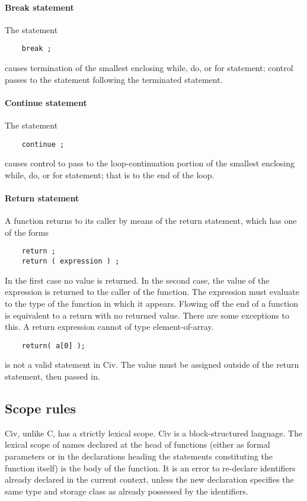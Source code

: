 \documentclass[a4paper]{article}
\begin{document}
\paragraph{Break statement}
The statement
\begin{verbatim}
    break ;
\end{verbatim}
causes termination of the smallest enclosing while, do, or for statement; control passes to the statement
following the terminated statement.

\paragraph{Continue statement}
The statement
\begin{verbatim}
    continue ;
\end{verbatim}
causes control to pass to the loop-continuation portion of the smallest enclosing while, do, or for statement; that is to the end of the loop.

\paragraph{Return statement}
A function returns to its caller by means of the return statement, which has one of the forms
\begin{verbatim}
    return ;
    return ( expression ) ;
\end{verbatim}
In the first case no value is returned. In the second case, the value of the expression is returned to the caller of the function. The expression must evaluate to the type of the function in which it appears.
Flowing off the end of a function is equivalent to a return with no returned value. There are some exceptions to this. A return expression cannot of type element-of-array. 
\begin{verbatim}
    return( a[0] );
\end{verbatim}
is not a valid statement in Civ. The value must be assigned outside of the return statement, then passed in.

\subsection{Scope rules}
Civ, unlike C, has a strictly lexical scope. Civ is a block-structured language. The lexical scope of names declared at the head of functions (either as formal parameters or in the declarations heading the statements constituting the function itself) is the body of the function. It is an error to re-declare identifiers already declared in the current context, unless the new declaration specifies the same type and storage class as already possessed by the identifiers.
\end{document}
